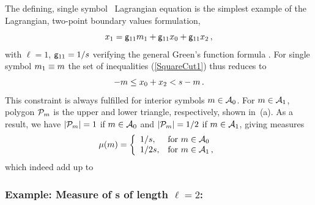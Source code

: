 \documentclass[12pt]{iopart}
\begin{document}
The defining, single symbol \brick\ Lagrangian equation
 is the simplest example of the Lagrangian,
two-point boundary values formulation,
\[
  x_1=\mathsf{g}_{11}{m_{1}}
          +\mathsf{g}_{11}x_0+\mathsf{g}_{11}x_{2}
\,,
\]
with $\ell=1$,  $\mathsf{g}_{11}=1/s$
verifying the general Green's function formula .
For  single symbol ${m_{1}}\equiv m$ the set of inequalities
(\ref{SquareCut1}) thus reduces to
 \[
   -m \leq x_{0}+x_{2} < s-m
 \,.
\]
This constraint is always fulfilled for interior symbols $m\in \mathcal{A}_0$. For
$m\in \mathcal{A}_1$, polygon $\mathcal{P}_{m}$ is the upper and lower triangle, respectively,
shown in \,(a).
As a result, we have   $|\mathcal{P}_{m}|=1$ if $m\in \mathcal{A}_0$ and $|\mathcal{P}_{m}|=1/2$
if $m\in \mathcal{A}_1$, giving measures
\[
 {\mu}(m)= \left\{\begin{array}{ll}
       1/s, & \mbox{for } m\in \mathcal{A}_0 \\
        1/2s, & \mbox{for } m\in \mathcal{A}_1 \,,
        \end{array}\right.
\]
which indeed add up to


 \subsubsection{Example: Measure of \brick s of length $\ell=2$:}
 \label{1Dblock2}
\end{document}
